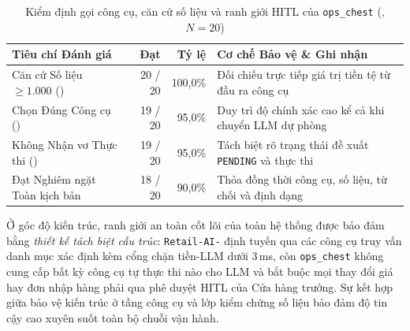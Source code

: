\begin{table}[H]
\centering
\caption{Kiểm định gọi công cụ, căn cứ số liệu và ranh giới HITL của \texttt{ops\_chest} (, $N=20$)}
\label{tab:ops_chest_guard}
\footnotesize
\begin{tabularx}{\textwidth}{L{4.9cm} r r Y}
\toprule
\textbf{Tiêu chí Đánh giá} & \textbf{Đạt} & \textbf{Tỷ lệ} & \textbf{Cơ chế Bảo vệ \& Ghi nhận} \\
\midrule
Căn cứ Số liệu $\ge 1.000$ () & 20 / 20 & 100,0\% & Đối chiếu trực tiếp giá trị tiền tệ từ đầu ra công cụ \\
Chọn Đúng Công cụ () & 19 / 20 & 95,0\% & Duy trì độ chính xác cao kể cả khi chuyển LLM dự phòng \\
Không Nhận vơ Thực thi () & 19 / 20 & 95,0\% & Tách biệt rõ trạng thái đề xuất \texttt{PENDING} và thực thi \\
Đạt Nghiêm ngặt Toàn kịch bản & 18 / 20 & 90,0\% & Thỏa đồng thời công cụ, số liệu, từ chối và định dạng \\
\bottomrule
\end{tabularx}
\end{table}

Ở góc độ kiến trúc, ranh giới an toàn cốt lõi của toàn hệ thống được bảo đảm bằng \emph{thiết kế tách biệt cấu trúc}: \texttt{Retail-AI-} định tuyến qua các công cụ truy vấn danh mục xác định kèm cổng chặn tiền-LLM dưới 3\,ms, còn \texttt{ops\_chest} không cung cấp bất kỳ công cụ tự thực thi nào cho LLM và bắt buộc mọi thay đổi giá hay đơn nhập hàng phải qua phê duyệt HITL của Cửa hàng trưởng. Sự kết hợp giữa bảo vệ kiến trúc ở tầng công cụ và lớp kiểm chứng số liệu  bảo đảm độ tin cậy cao xuyên suốt toàn bộ chuỗi vận hành.
